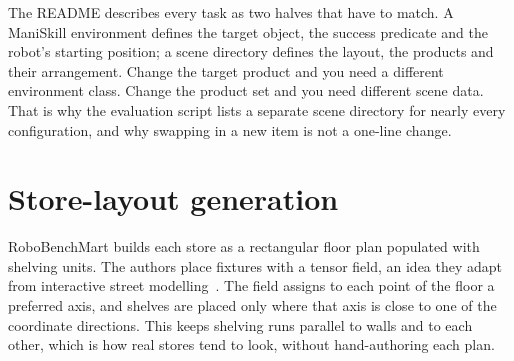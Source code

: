 The README describes every task as two halves that have to match. A ManiSkill environment defines the target object, the success predicate and the robot's starting position; a scene directory defines the layout, the products and their arrangement. Change the target product and you need a different environment class. Change the product set and you need different scene data. That is why the evaluation script lists a separate scene directory for nearly every configuration, and why swapping in a new item is not a one-line change.

\section{Store-layout generation}
\label{sec:layout}

RoboBenchMart builds each store as a rectangular floor plan populated with shelving units. The authors place fixtures with a tensor field, an idea they adapt from interactive street modelling~\cite{chen2008interactive}. The field assigns to each point of the floor a preferred axis, and shelves are placed only where that axis is close to one of the coordinate directions. This keeps shelving runs parallel to walls and to each other, which is how real stores tend to look, without hand-authoring each plan.

